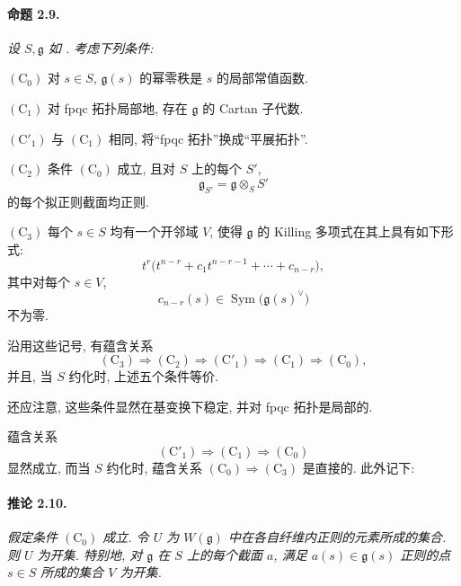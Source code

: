 
\paragraph{\textbf{命题 2.9.}}
{\itshape 设 \(S,\mathfrak g\) 如 . 考虑下列条件:

\smallskip
\noindent
\textup{\((\mathrm C_0)\)}
对 \(s\in S\), \(\mathfrak g(s)\) 的幂零秩是 \(s\) 的局部常值函数.

\smallskip
\noindent
\textup{\((\mathrm C_1)\)}
对 fpqc 拓扑局部地, 存在 \(\mathfrak g\) 的 Cartan 子代数.

\smallskip
\noindent
\textup{\((\mathrm C'_1)\)}
与 \((\mathrm C_1)\) 相同, 将“fpqc 拓扑”换成“平展拓扑”.

\smallskip
\noindent
\textup{\((\mathrm C_2)\)}
条件 \((\mathrm C_0)\) 成立, 且对 \(S\) 上的每个 \(S'\),
\[
  \mathfrak g_{S'}=\mathfrak g\otimes_S S'
\]
的每个拟正则截面均正则.

\smallskip
\noindent
\textup{\((\mathrm C_3)\)}
每个 \(s\in S\) 均有一个开邻域 \(V\), 使得 \(\mathfrak g\) 的 Killing 多项式在其上具有如下形式:
\[
  t^r\bigl(t^{n-r}+c_1t^{n-r-1}+\cdots+c_{n-r}\bigr),
\]
其中对每个 \(s\in V\),
\[
  c_{n-r}(s)\in
  \operatorname{Sym}\!\bigl(\mathfrak g(s)^\vee\bigr)
\]
不为零.

\smallskip
沿用这些记号, 有蕴含关系
\[
  (\mathrm C_3)\Longrightarrow(\mathrm C_2)
  \Longrightarrow(\mathrm C'_1)\Longrightarrow(\mathrm C_1)
  \Longrightarrow(\mathrm C_0),
\]
并且, 当 \(S\) 约化时, 上述五个条件等价.}

还应注意, 这些条件显然在基变换下稳定, 并对 fpqc 拓扑是局部的.

蕴含关系
\[
  (\mathrm C'_1)\Longrightarrow(\mathrm C_1)
  \Longrightarrow(\mathrm C_0)
\]
显然成立, 而当 \(S\) 约化时, 蕴含关系 \((\mathrm C_0)\Longrightarrow(\mathrm C_3)\) 是直接的. 此外记下:

\paragraph{\textbf{推论 2.10.}}
\emph{假定条件 \((\mathrm C_0)\) 成立. 令 \(U\) 为 \(W(\mathfrak g)\) 中在各自纤维内正则的元素所成的集合. 则 \(U\) 为开集. 特别地, 对 \(\mathfrak g\) 在 \(S\) 上的每个截面 \(a\), 满足 \(a(s)\in\mathfrak g(s)\) 正则的点 \(s\in S\) 所成的集合 \(V\) 为开集.}

